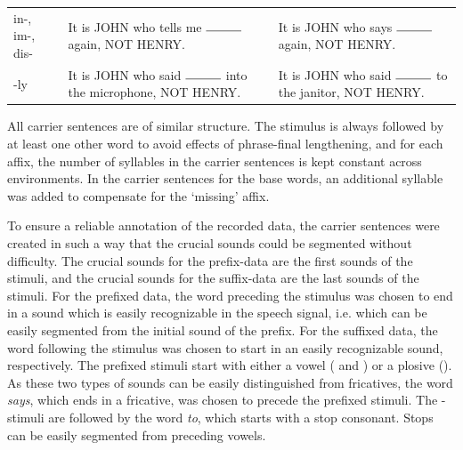 \begin{table}[t!]
\begin{center}
{\begin{tabular} {p{2.5cm}p{5.5cm}p{6cm}}
  			
  			in-, im-, dis- &   {It is JOHN who tells me $\rule{1cm}{0.15mm}$ } again, NOT HENRY. &  {It is JOHN who says $\rule{1cm}{0.15mm}$}  again, NOT HENRY. \\
		
  			-ly 					& {It is JOHN who said $\rule{1cm}{0.15mm}$ into the microphone, NOT HENRY.} &   {It is JOHN who said $\rule{1cm}{0.15mm}$ to the janitor, NOT HENRY.} \\

  			\hline   	
  		\end{tabular}
  			}
  	\end{center}
  \end{table}
  
  

All carrier sentences are of similar structure. 
The stimulus is always followed by at least one other word to avoid effects of phrase-final lengthening, and for each affix, the number of syllables in the carrier sentences is kept constant across environments. 
In the carrier sentences for the base words, an additional syllable was added to compensate for the `missing' affix. 


To ensure a reliable annotation of the recorded data, the carrier sentences were created in such a way that the crucial sounds could be segmented without difficulty. The crucial sounds for the prefix-data are the first sounds of the stimuli, and the crucial sounds for the suffix-data are the last sounds of the stimuli. 
For the prefixed data, the word preceding the stimulus was chosen to end in a sound which is easily recognizable in the speech signal, i.e. which can be easily segmented from the initial sound of the prefix. For the suffixed data, the word following the stimulus was chosen to start in an easily recognizable sound, respectively. 
The prefixed stimuli start with either a vowel ( and ) or a plosive (). As these two types of sounds can be easily distinguished from fricatives,   the word \textit{says}, which ends in a fricative, was chosen to precede the prefixed stimuli. 
The -stimuli are followed by the word \textit{to}, which starts with a stop consonant. Stops can be easily segmented from preceding vowels.  


